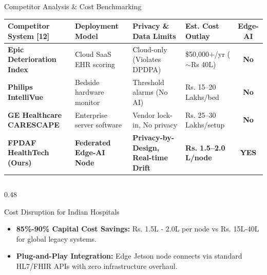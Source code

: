 \documentclass[aspectratio=169, 11pt]{beamer}
\begin{document}
\begin{frame}{Competitor Analysis \& Cost Benchmarking}
    \centering
    \tiny
    \setlength{\tabcolsep}{4pt}
    \renewcommand{\arraystretch}{1.25}
    \begin{tabular}{p{3.2cm} p{2.6cm} p{3.2cm} p{2.2cm} c}
    \hline
    \rowcolor{lightCyanBg}
    \textbf{\textcolor{neonCyan}{Competitor System [12]}} & \textbf{\textcolor{neonCyan}{Deployment Model}} & \textbf{\textcolor{neonCyan}{Privacy \& Data Limits}} & \textbf{\textcolor{neonCyan}{Est. Cost Outlay}} & \textbf{\textcolor{neonCyan}{Edge-AI}} \\
    \hline
    \textbf{Epic Deterioration Index} & Cloud SaaS EHR scoring & Cloud-only (Violates DPDPA) & \$50,000+/yr ($\sim$Rs 40L) & \textcolor{neonRose}{\textbf{No}} \\
    \textbf{Philips IntelliVue} & Bedside hardware monitor & Threshold alarms (No AI) & Rs. 15--20 Lakhs/bed & \textcolor{neonRose}{\textbf{No}} \\
    \textbf{GE Healthcare CARESCAPE} & Enterprise server software & Vendor lock-in, No privacy & Rs. 25--30 Lakhs/setup & \textcolor{neonRose}{\textbf{No}} \\
    \rowcolor{lightTealBg}
    \textbf{\textcolor{textColor}{FPDAF HealthTech (Ours)}} & \textbf{\textcolor{textColor}{Federated Edge-AI Node}} & \textbf{\textcolor{textColor}{Privacy-by-Design, Real-time Drift}} & \textbf{\textcolor{neonTeal}{Rs. 1.5--2.0 L/node}} & \textbf{\textcolor{neonTeal}{YES}} \\
    \hline
    \end{tabular}
    
    \vspace{0.12cm}
    \begin{columns}[t]
        \begin{column}{0.48\textwidth}
            \begin{block}{\textcolor{neonAmber}{Cost Disruption for Indian Hospitals}}
                \tiny
                \begin{itemize}
                    \item \textbf{85\%-90\% Capital Cost Savings:} Rs. 1.5L - 2.0L per node vs Rs. 15L-40L for global legacy systems.
                    \item \textbf{Plug-and-Play Integration:} Edge Jetson node connects via standard HL7/FHIR APIs with zero infrastructure overhaul.
                \end{itemize}
            \end{block}
        \end{column}
        

\end{columns}
\end{frame}
\end{document}
